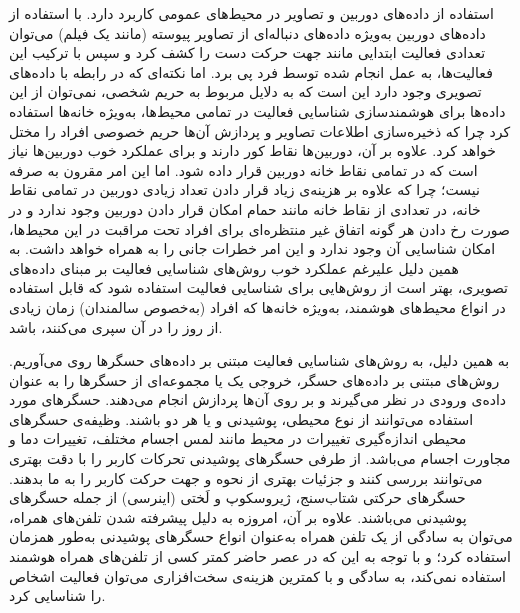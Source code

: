 استفاده از داده‌های دوربین و تصاویر در محیط‌های عمومی کاربرد دارد. با استفاده از داده‌های دوربین به‌ویژه داده‌های دنباله‌ای از تصاویر پیوسته (مانند یک فیلم) می‌توان تعدادی
فعالیت ابتدایی
مانند جهت حرکت دست را کشف کرد و سپس با ترکیب این فعالیت‌ها، به عمل انجام شده توسط فرد پی برد\cite{dhillon2017recent}.
اما نکته‌ای که در رابطه با داده‌های تصویری وجود دارد این است که به دلایل مربوط به حریم شخصی، نمی‌توان از این داده‌ها برای هوشمندسازی شناسایی فعالیت در تمامی محیط‌ها، به‌ویژه خانه‌ها استفاده کرد چرا که ذخیره‌سازی اطلاعات تصاویر و پردازش آن‌ها حریم خصوصی افراد را مختل خواهد کرد. علاوه بر آن، دوربین‌ها نقاط کور دارند و برای عملکرد خوب دوربین‌ها نیاز است که در تمامی نقاط خانه دوربین قرار داده شود. اما این امر مقرون به صرفه نیست؛ چرا که علاوه بر هزینه‌ی زیاد قرار دادن تعداد زیادی دوربین در تمامی نقاط خانه، در تعدادی از نقاط خانه مانند حمام امکان قرار دادن دوربین وجود ندارد و در صورت رخ دادن هر گونه اتفاق غیر منتظره‌ای برای افراد تحت مراقبت در این محیط‌ها، امکان شناسایی آن وجود ندارد و این امر خطرات جانی را به همراه خواهد داشت. به همین دلیل علیرغم عملکرد خوب روش‌های شناسایی فعالیت بر مبنای
داده‌های تصویری\cite{mathew2023human}،
بهتر است از روش‌هایی برای شناسایی فعالیت استفاده شود که قابل استفاده در انواع محیط‌های هوشمند، به‌ویژه خانه‌ها که افراد (به‌خصوص سالمندان) زمان زیادی از روز را در آن سپری می‌کنند، باشد.

به همین دلیل، به روش‌های شناسایی فعالیت مبتنی بر داده‌های حسگرها روی می‌آوریم. روش‌های مبتنی بر داده‌های حسگر، خروجی یک یا مجموعه‌ای از حسگرها را به عنوان داده‌ی ورودی در نظر می‌گیرند و بر روی آن‌ها پردازش انجام می‌دهند. حسگرهای مورد استفاده می‌توانند از نوع
محیطی\cite{cook2012casas}،
پوشیدنی\cite{vavoulas2016mobiact}
و یا هر دو\cite{roggen2010walk}
باشند. وظیفه‌ی حسگرهای محیطی اندازه‌گیری تغییرات در محیط مانند لمس اجسام مختلف، تغییرات دما و مجاورت اجسام می‌باشد. از طرفی حسگرهای پوشیدنی تحرکات کاربر را با دقت بهتری می‌توانند بررسی کنند و جزئیات بهتری از نحوه و جهت حرکت کاربر را به ما بدهند. حسگرهای حرکتی
شتاب‌سنج،
ژیروسکوپ
و لَختی (اینرسی)
از جمله حسگرهای پوشیدنی می‌باشند. علاوه بر آن، امروزه به دلیل پیشرفته شدن تلفن‌های همراه، می‌توان به سادگی از یک تلفن همراه به‌عنوان انواع حسگرهای پوشیدنی به‌طور همزمان استفاده کرد\cite{reyes2016transition}؛
و با توجه به این که در عصر حاضر کمتر کسی از تلفن‌های همراه هوشمند استفاده نمی‌کند، به سادگی و با کمترین هزینه‌ی سخت‌افزاری می‌توان فعالیت اشخاص را شناسایی کرد.


